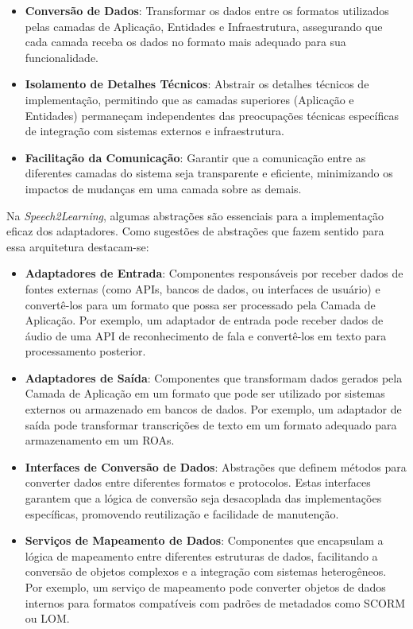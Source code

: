 \begin{itemize}
    \item \textbf{Conversão de Dados}: Transformar os dados entre os formatos utilizados pelas camadas de Aplicação, Entidades e Infraestrutura, assegurando que cada camada receba os dados no formato mais adequado para sua funcionalidade.

    \item \textbf{Isolamento de Detalhes Técnicos}: Abstrair os detalhes técnicos de implementação, permitindo que as camadas superiores (Aplicação e Entidades) permaneçam independentes das preocupações técnicas específicas de integração com sistemas externos e infraestrutura.

    \item \textbf{Facilitação da Comunicação}: Garantir que a comunicação entre as diferentes camadas do sistema seja transparente e eficiente, minimizando os impactos de mudanças em uma camada sobre as demais.
\end{itemize}

Na \textit{Speech2Learning}, algumas abstrações são essenciais para a implementação eficaz dos adaptadores. Como sugestões de abstrações que fazem sentido para essa arquitetura destacam-se:

\begin{itemize}
    \item \textbf{Adaptadores de Entrada}: Componentes responsáveis por receber dados de fontes externas (como APIs, bancos de dados, ou interfaces de usuário) e convertê-los para um formato que possa ser processado pela Camada de Aplicação. Por exemplo, um adaptador de entrada pode receber dados de áudio de uma API de reconhecimento de fala e convertê-los em texto para processamento posterior.

    \item \textbf{Adaptadores de Saída}: Componentes que transformam dados gerados pela Camada de Aplicação em um formato que pode ser utilizado por sistemas externos ou armazenado em bancos de dados. Por exemplo, um adaptador de saída pode transformar transcrições de texto em um formato adequado para armazenamento em um ROAs.

    \item \textbf{Interfaces de Conversão de Dados}: Abstrações que definem métodos para converter dados entre diferentes formatos e protocolos. Estas interfaces garantem que a lógica de conversão seja desacoplada das implementações específicas, promovendo reutilização e facilidade de manutenção.

    \item \textbf{Serviços de Mapeamento de Dados}: Componentes que encapsulam a lógica de mapeamento entre diferentes estruturas de dados, facilitando a conversão de objetos complexos e a integração com sistemas heterogêneos. Por exemplo, um serviço de mapeamento pode converter objetos de dados internos para formatos compatíveis com padrões de metadados como SCORM ou LOM.
\end{itemize}

